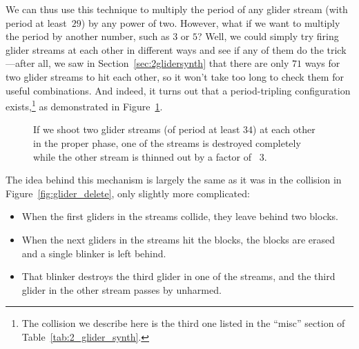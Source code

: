 We can thus use this technique to multiply the period of any glider stream (with period at least~$29$) by any power of two. However, what if we want to multiply the period by another number, such as $3$ or $5$? Well, we could simply try firing glider streams at each other in different ways and see if any of them do the trick---after all, we saw in Section~\ref{sec:2glidersynth} that there are only $71$ ways for two glider streams to hit each other, so it won't take too long to check them for useful combinations. And indeed, it turns out that a period-tripling configuration exists,\footnote{The collision we describe here is the third one listed in the ``misc'' section of Table~\ref{tab:2_glider_synth}.} as demonstrated in Figure~\ref{fig:glider_delete2}.
\begin{figure}[!htb]
	\centering
	\caption{If we shoot two glider streams (of period at least $34$) at each other in the proper phase, one of the streams is destroyed completely while the other stream is thinned out by a factor of ~$3$.}\label{fig:glider_delete2}
\end{figure}

The idea behind this mechanism is largely the same as it was in the collision in Figure~\ref{fig:glider_delete}, only slightly more complicated:\medskip

\begin{itemize}
	\item When the first gliders in the streams collide, they leave behind two blocks.\smallskip
	
	\item When the next gliders in the streams hit the blocks, the blocks are erased and a single blinker is left behind.\smallskip
	
	\item That blinker destroys the third glider in one of the streams, and the third glider in the other stream passes by unharmed.\medskip
\end{itemize}

